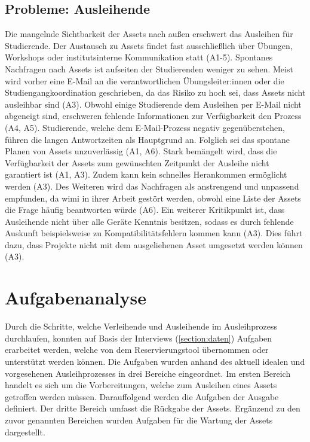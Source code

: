 \subsection{Probleme: Ausleihende}
\label{section:probleme-Ausleihende}
Die mangelnde Sichtbarkeit der Assets nach außen erschwert das Ausleihen für
Studierende. Der Austausch zu Assets findet fast ausschließlich über Übungen,
Workshops oder institutsinterne Kommunikation statt (A1-5). Spontanes Nachfragen
nach Assets ist aufseiten der Studierenden weniger zu sehen. Meist wird vorher
eine E-Mail an die verantwortlichen Übungsleiter:innen oder die
Studiengangkoordination geschrieben, da das Risiko zu hoch sei, dass Assets
nicht ausleihbar sind (A3). Obwohl einige Studierende dem Ausleihen per E-Mail
nicht abgeneigt sind, erschweren fehlende Informationen zur Verfügbarkeit den
Prozess (A4, A5). Studierende, welche dem E-Mail-Prozess negativ
gegenüberstehen, führen die langen Antwortzeiten als Hauptgrund an. Folglich sei
das spontane Planen von Assets unzuverlässig (A1, A6). Stark bemängelt wird,
dass die Verfügbarkeit der Assets zum gewünschten Zeitpunkt der Ausleihe nicht
garantiert ist (A1, A3). Zudem kann kein schnelles Herankommen ermöglicht werden
(A3). Des Weiteren wird das Nachfragen als anstrengend und unpassend empfunden,
da \ac{wimi} in ihrer Arbeit gestört werden, obwohl eine Liste der Assets die
Frage häufig beantworten würde (A6). Ein weiterer Kritikpunkt ist, dass
Ausleihende nicht über alle Geräte Kenntnis besitzen, sodass es durch fehlende
Auskunft beispielsweise zu Kompatibilitätsfehlern kommen kann (A3). Dies führt
dazu, dass Projekte nicht mit dem ausgeliehenen Asset umgesetzt werden können
(A3).

\section{Aufgabenanalyse}
\label{section:aufgaben}
Durch die Schritte, welche Verleihende und Ausleihende im Ausleihprozess
durchlaufen, konnten auf Basis der Interviews (\ref{section:daten}) Aufgaben
erarbeitet werden, welche von dem Reservierungstool übernommen oder unterstützt
werden können. Die Aufgaben wurden anhand des aktuell idealen und vorgesehenen
Ausleihprozesses in drei Bereiche eingeordnet. Im ersten Bereich handelt es sich
um die Vorbereitungen, welche zum Ausleihen eines Assets getroffen werden
müssen. Darauffolgend werden die Aufgaben der Ausgabe definiert. Der dritte
Bereich umfasst die Rückgabe der Assets. Ergänzend zu den zuvor genannten
Bereichen wurden Aufgaben für die Wartung der Assets dargestellt.

